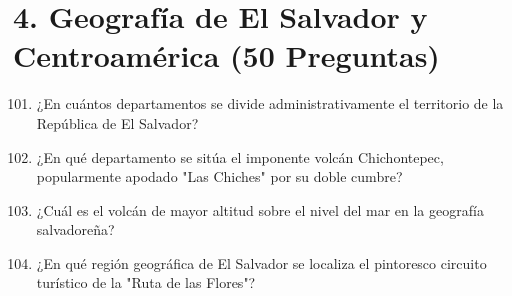 \documentclass[10pt,a4paper]{article}
\begin{document}
\section{4. Geografía de El Salvador y Centroamérica (50 Preguntas)}

\begin{enumerate}[label=\textbf{\arabic*.}]
\setcounter{enumi}{100}
\item ¿En cuántos departamentos se divide administrativamente el territorio de la República de El Salvador?
\begin{enumerate}[label=\textbf{\Alph*)}]
\end{enumerate}
\vspace{0.15cm}
\item ¿En qué departamento se sitúa el imponente volcán Chichontepec, popularmente apodado "Las Chiches" por su doble cumbre?
\begin{enumerate}[label=\textbf{\Alph*)}]
\end{enumerate}
\vspace{0.15cm}
\item ¿Cuál es el volcán de mayor altitud sobre el nivel del mar en la geografía salvadoreña?
\begin{enumerate}[label=\textbf{\Alph*)}]
\end{enumerate}
\vspace{0.15cm}
\item ¿En qué región geográfica de El Salvador se localiza el pintoresco circuito turístico de la "Ruta de las Flores"?

\end{enumerate}
\end{document}
